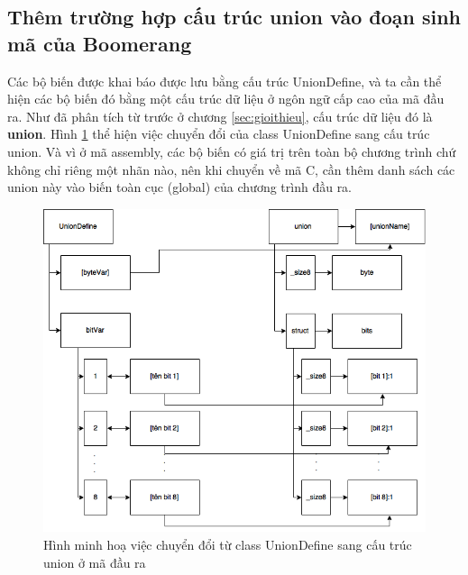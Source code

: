 \subsection{Thêm trường hợp cấu trúc union vào đoạn sinh mã của Boomerang}

Các bộ biến được khai báo được lưu bằng cấu trúc UnionDefine, và ta cần thể hiện các bộ biến đó bằng một cấu trúc dữ liệu ở ngôn ngữ cấp cao của mã đầu ra. Như đã phân tích từ trước ở chương \ref{sec:gioithieu}, cấu trúc dữ liệu đó là \textbf{union}. Hình \ref{fig:uniondefinemapping} thể hiện việc chuyển đổi của class UnionDefine sang cấu trúc union. Và vì ở mã assembly, các bộ biến có giá trị trên toàn bộ chương trình chứ không chỉ riêng một nhãn nào, nên khi chuyển về mã C, cần thêm danh sách các union này vào biến toàn cục (global) của chương trình đầu ra.

\begin{figure}[h!]
\centering
\includegraphics[width=0.7\linewidth]{image/unionDefineMapping}
\caption{Hình minh hoạ việc chuyển đổi từ class UnionDefine sang cấu trúc union ở mã đầu ra}
\label{fig:uniondefinemapping}
\end{figure}

